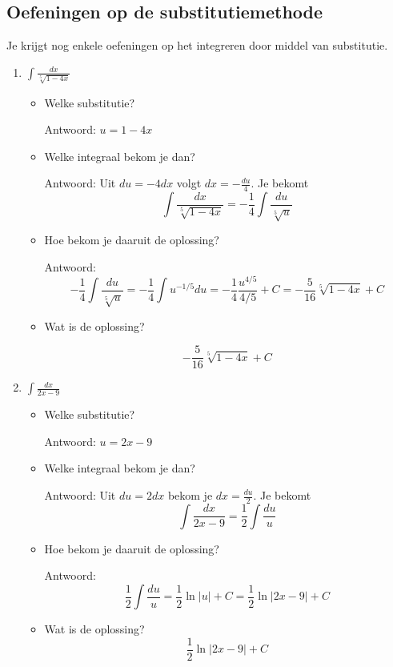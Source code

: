 \subsection{Oefeningen op de substitutiemethode}
Je krijgt nog enkele oefeningen op het integreren door middel van substitutie.

\begin{enumerate}
	
	\item $\int \frac{dx}{\sqrt[5]{1-4x}}$
	
	\begin{itemize}
		\item Welke substitutie?
		
		Antwoord: $u=1-4x$
		\item Welke integraal bekom je dan?
		
		Antwoord: Uit $du=-4dx$ volgt $dx=-\frac{du}{4}$.
		Je bekomt
		\[
		\int \frac{dx}{\sqrt[5]{1-4x}}=-\frac{1}{4}\int \frac{du}{\sqrt[5]{u} }
		\]
		
		\item Hoe bekom je daaruit de oplossing?
		
		Antwoord: 
		\[
		-\frac{1}{4}\int \frac{du}{\sqrt[5]{u}}=-\frac{1}{4}\int u^{-1/5}du = -\frac{1}{4}\frac{u^{4/5}}{4/5}+C=-\frac{5}{16}\sqrt[5]{1-4x}+C 
		\]
		
		\item Wat is de oplossing?
		
		\[
		-\frac{5}{16}\sqrt[5]{1-4x}+C 
		\]
	\end{itemize}
	
	
	\item $\int \frac{dx}{2x-9}$
	
	\begin{itemize}
		\item Welke substitutie?
		
		Antwoord: $u=2x-9$
		
		\item Welke integraal bekom je dan?
		
		Antwoord: Uit $du=2dx$ bekom je $dx=\frac{du}{2}$.
		Je bekomt
		\[
		\int \frac{dx}{2x-9}=\frac{1}{2} \int \frac{du}{u}
		\]
		
		\item Hoe bekom je daaruit de oplossing?
		
		Antwoord:
		\[
		\frac{1}{2} \int \frac{du}{u}=\frac{1}{2} \ln \vert u \vert+C=\frac{1}{2} \ln \vert 2x-9 \vert +C
		\]
		
		\item Wat is de oplossing?
		\[
		\frac{1}{2} \ln \vert 2x-9 \vert +C
		\]
		

\end{itemize}
\end{enumerate}
